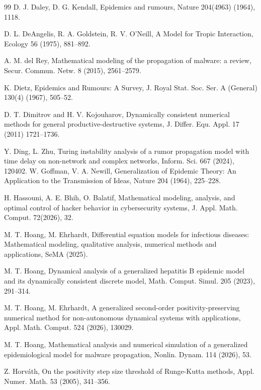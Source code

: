 \documentclass[11pt]{article}
\theoremstyle{definition}
\theoremstyle{remark}
\numberwithin{equation}{section}
\begin{document}
\begin{thebibliography}{99}
D. J. Daley, D. G. Kendall, 
Epidemics and rumours,
Nature 204(4963) (1964), 1118.

D. L. DeAngelis, R. A. Goldstein, R. V. O'Neill, 
A Model for Tropic Interaction, 
Ecology 56 (1975), 881--892.

 A. M. del Rey, 
 Mathematical modeling of the propagation of malware: a review, 
 Secur. Commun. Netw. 8 (2015), 2561--2579.
 
K. Dietz, 
Epidemics and Rumours: A Survey, 
J. Royal Stat. Soc. Ser. A (General) 130(4) (1967), 505--52.

D. T. Dimitrov and H. V. Kojouharov, {Dynamically consistent numerical methods for general productive-destructive systems}, 
J. Differ. Equ. Appl. {17} (2011) 1721--1736.

Y. Ding, L. Zhu, 
Turing instability analysis of a rumor propagation model with time delay on non-network and complex networks, 
Inform. Sci.  667 (2024), 120402.
W. Goffman, V. A. Newill, 
Generalization of Epidemic Theory: An Application to the Transmission of Ideas, 
Nature 204 (1964), 225--228.

H. Hassouni, A. E. Bhih, O. Balatif, 
Mathematical modeling, analysis, and optimal control of hacker behavior in cybersecurity systems, 
J. Appl. Math. Comput. 72(2026), 32.

M. T. Hoang,  M. Ehrhardt, 
Differential equation models for infectious diseases: Mathematical modeling, qualitative analysis, numerical methods and applications, 
SeMA (2025). 

M. T. Hoang, 
Dynamical analysis of a generalized hepatitis B epidemic model and its dynamically consistent discrete model, 
Math. Comput. Simul. 205 (2023), 291--314.

M. T. Hoang, M. Ehrhardt, 
A generalized second-order positivity-preserving numerical method for non-autonomous dynamical systems with applications,
Appl. Math. Comput. 524 (2026), 130029.

M. T. Hoang, 
Mathematical analysis and numerical simulation of a generalized epidemiological model for malware propagation, 
Nonlin. Dynam. 114 (2026), 53.

Z. Horv\'ath, 
On the positivity step size threshold of Runge-Kutta methods,
Appl. Numer. Math. 53 (2005), 341--356.


\end{thebibliography}
\end{document}
